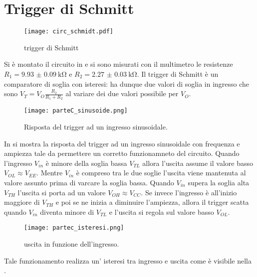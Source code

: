 \section{Trigger di Schmitt}

\begin{figure}[h]
	\centering
	\texttt{[image: circ\_schmidt.pdf]}
	\caption{trigger di Schmitt}
	\label{f:trigger}
\end{figure}

Si è montato il circuito in  e si sono misurati con il multimetro le resistenze $R_1= \SI{9.93(9)}{\kohm}$ e $R_2=\SI{2.27(3)}{\kohm}$. Il trigger di Schmitt è un comparatore di soglia con isteresi: ha dunque due valori di soglia in ingresso che sono $V_{T}= V_{O}\frac{R_2}{R_1+R_2}$ al variare dei due valori possibile per $V_O$.
\begin{figure}[h]
	\centering
	\texttt{[image: parteC\_sinusoide.png]}
	\caption{Risposta del trigger ad un ingresso sinusoidale.}
	\label{f:sinusoide}
\end{figure}
In  si mostra la risposta del trigger ad un ingresso sinusoidale con frequenza e ampiezza tale da permettere un corretto funzionamneto del circuito.
Quando l'ingresso $V_{in}$ è minore della soglia bassa $V_{TL}$ allora l'uscita assume il valore basso $V_{OL} \approx V_{EE}$. Mentre $V_{in}$ è compreso tra le due soglie l'uscita viene mantenuta al valore assunto prima di varcare la soglia bassa. Quando $V_{in}$ supera la soglia alta $V_{TH}$ l'uscita si porta ad un valore $V_{OH} \approx V_{CC}$. 
Se invece l'ingresso è all'inizio maggiore di $V_{TH}$ e poi se ne inizia a diminuire l'ampiezza, allora il trigger scatta quando $V_{in}$ diventa minore di $V_{TL}$ e l'uscita si regola sul valore basso $V_{OL}$.

\begin{figure}[h]
	\centering
	\texttt{[image: partec\_isteresi.png]}
	\caption{uscita in funzione dell'ingresso.}
	\label{f:isteresi}
\end{figure}
Tale funzionamento realizza un' isteresi tra ingresso e uscita come è visibile nella .

